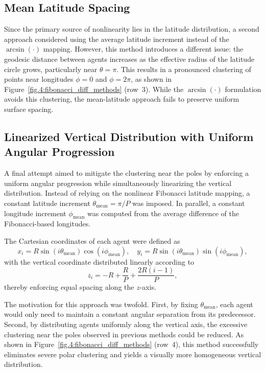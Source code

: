 \subsection{Mean Latitude Spacing}
Since the primary source of nonlinearity lies in the latitude distribution, a second approach considered using the average latitude increment instead of the $\arcsin(\cdot)$ mapping. However, this method introduces a different issue: the geodesic distance between agents increases as the effective radius of the latitude circle grows, particularly near $\theta = \pi$. This results in a pronounced clustering of points near longitudes $\phi = 0$ and $\phi = 2\pi$, as shown in Figure~\ref{fig.4:fibonacci_diff_methods} (row~3). While the $\arcsin(\cdot)$ formulation avoids this clustering, the mean-latitude approach fails to preserve uniform surface spacing.

\subsection{Linearized Vertical Distribution with Uniform Angular Progression}
A final attempt aimed to mitigate the clustering near the poles by enforcing a uniform angular progression while simultaneously linearizing the vertical distribution. Instead of relying on the nonlinear Fibonacci latitude mapping, a constant latitude increment $\theta_{\text{mean}} = \pi / P$ was imposed. In parallel, a constant longitude increment $\phi_{\text{mean}}$ was computed from the average difference of the Fibonacci-based longitudes.

The Cartesian coordinates of each agent were defined as
\begin{equation}
x_i = R \sin(i\theta_{\text{mean}})\cos(i\phi_{\text{mean}}), \quad
y_i = R \sin(i\theta_{\text{mean}})\sin(i\phi_{\text{mean}}),
\end{equation}
with the vertical coordinate distributed linearly according to
\begin{equation}
z_i = -R + \frac{R}{P} + \frac{2R(i-1)}{P},
\end{equation}
thereby enforcing equal spacing along the $z$-axis.

The motivation for this approach was twofold. First, by fixing $\theta_{\text{mean}}$, each agent would only need to maintain a constant angular separation from its predecessor. Second, by distributing agents uniformly along the vertical axis, the excessive clustering near the poles observed in previous methods could be reduced. As shown in Figure~\ref{fig.4:fibonacci_diff_methods} (row~4), this method successfully eliminates severe polar clustering and yields a visually more homogeneous vertical distribution.

